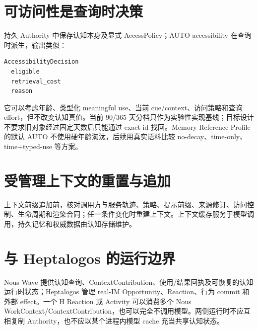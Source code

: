 \section{可访问性是查询时决策}

持久 Authority 中保存认知本身及显式 AccessPolicy；AUTO accessibility 在查询时派生，输出类似：

\begin{verbatim}
AccessibilityDecision
  eligible
  retrieval_cost
  reason
\end{verbatim}

它可以考虑年龄、类型化 meaningful use、当前 cue/context、访问策略和查询 effort，但不改变认知真值。当前 90/365 天分档只作为实验性实现基线；目标设计不要求旧对象经过固定天数后只能通过 exact id 找回。Memory Reference Profile 的默认 AUTO 不使用硬年龄淘汰，后续用真实语料比较 no-decay、time-only、time+typed-use 等方案。

\section{受管理上下文的重置与追加}

上下文前缀追加前，核对调用方与服务轨迹、策略、提示前缀、来源修订、访问控制、生命周期和渲染合同；任一条件变化时重建上下文。上下文缓存服务于模型调用，持久记忆和权威数据由认知存储维护。

\section{与 Heptalogos 的运行边界}

Nous Wave 提供认知查询、ContextContribution、使用/结果回执及可恢复的认知运行时状态；Heptalogos 管理 real-IM Opportunity、Reaction、行为 commit 和外部 effect。一个 H Reaction 或 Activity 可以消费多个 Nous WorkContext/ContextContribution，也可以完全不调用模型。两侧运行时不应互相复制 Authority，也不应以某个进程内模型 cache 充当共享认知状态。\cite{heptalogos-code-snapshot}
